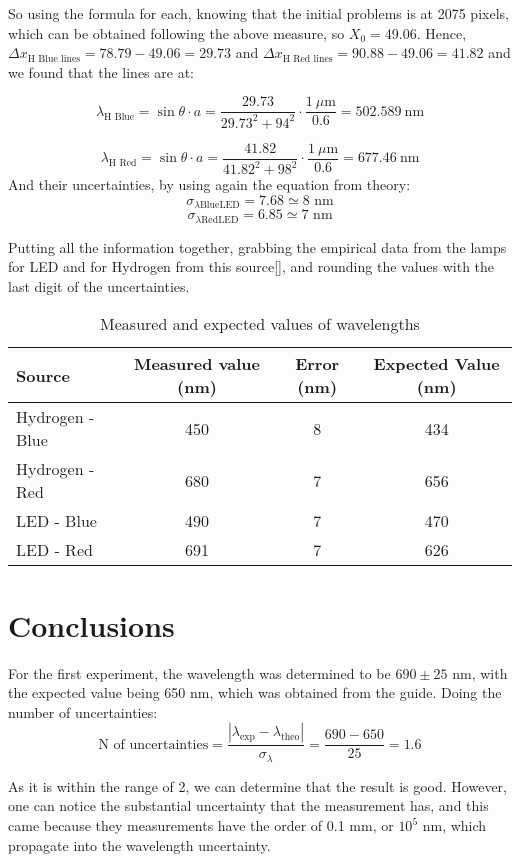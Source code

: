 So using the formula for each, knowing that the initial problems is at 2075 pixels, which can be obtained following the above measure, so $X_0=$49.06. Hence, $\Delta x_\text{H Blue lines}= 78.79-49.06=29.73$ and $\Delta x_\text{H Red lines}= 90.88-49.06=41.82$  and we found that the lines are at:

$$\lambda_\text{H Blue}  = \sin \theta \cdot a = \frac{29.73}{29.73^2+94^2} \cdot \frac{1 \ \mu \text{m}}{0.6} = \boxed{502.589 \ \text{nm}} $$

$$\lambda_\text{H Red}  = \sin \theta \cdot a = \frac{41.82}{41.82^2+98^2} \cdot \frac{1 \ \mu \text{m}}{0.6} = \boxed{677.46 \ \text{nm}} $$
And their uncertainties, by using again the equation from theory:
$$\sigma_{\lambda\text{BlueLED}}  = 7.68 \simeq 8  \text{ nm}$$
$$\sigma_{\lambda\text{RedLED}} =  6.85 \simeq 7\text{ nm}$$

Putting all the information together, grabbing the empirical data from the lamps for LED and for Hydrogen from this source[\cite{guide}], and rounding the values with the last digit of the uncertainties.
\begin{table}[H]
\centering
\caption{Measured and expected values of wavelengths}
\begin{tabular}{lccc}
\toprule
Source & Measured value (nm) & Error (nm) & Expected Value (nm) \\
\midrule
Hydrogen - Blue & 450 & 8 & 434 \\
Hydrogen - Red & 680 & 7 & 656 \\
LED - Blue & 490 & 7 & 470 \\
LED - Red & 691 & 7 & 626 \\
\bottomrule
\end{tabular}
\end{table}

\section{Conclusions}

For the first experiment, the wavelength was determined to be $690 \pm 25$ nm, with the expected value being 650 nm, which was obtained from the guide. Doing the number of uncertainties:
$$\text{N of uncertainties}= \frac{|\lambda_{\text{exp}}- \lambda_{\text{theo}}|}{\sigma_\lambda}=\frac{690-650}{25}=1.6$$

As it is within the range of 2, we can determine that the result is good. However, one can notice the substantial uncertainty that the measurement has, and this came because they measurements have the order of 0.1 mm, or $10^5$ nm, which propagate into the wavelength uncertainty.

